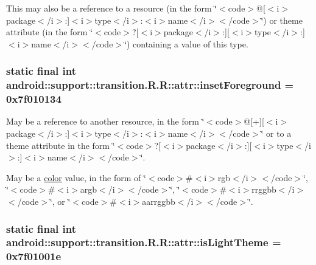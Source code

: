 This may also be a reference to a resource (in the form \char`\"{}$<$code$>$@\mbox{[}$<$i$>$package$<$/i$>$:\mbox{]}$<$i$>$type$<$/i$>$:$<$i$>$name$<$/i$>$$<$/code$>$\char`\"{}) or theme attribute (in the form \char`\"{}$<$code$>$?\mbox{[}$<$i$>$package$<$/i$>$:\mbox{]}\mbox{[}$<$i$>$type$<$/i$>$:\mbox{]}$<$i$>$name$<$/i$>$$<$/code$>$\char`\"{}) containing a value of this type. \hypertarget{classandroid_1_1support_1_1transition_1_1_r_1_1attr_d388c6c0c1f51b02f0308a0bafe4e93e}{
\subsubsection[{insetForeground}]{\setlength{\rightskip}{0pt plus 5cm}static final int android::support::transition.R.R::attr::insetForeground = 0x7f010134}}
\label{classandroid_1_1support_1_1transition_1_1_r_1_1attr_d388c6c0c1f51b02f0308a0bafe4e93e}


May be a reference to another resource, in the form \char`\"{}$<$code$>$@\mbox{[}+\mbox{]}\mbox{[}$<$i$>$package$<$/i$>$:\mbox{]}$<$i$>$type$<$/i$>$:$<$i$>$name$<$/i$>$$<$/code$>$\char`\"{} or to a theme attribute in the form \char`\"{}$<$code$>$?\mbox{[}$<$i$>$package$<$/i$>$:\mbox{]}\mbox{[}$<$i$>$type$<$/i$>$:\mbox{]}$<$i$>$name$<$/i$>$$<$/code$>$\char`\"{}. 

May be a \hyperlink{classandroid_1_1support_1_1transition_1_1_r_1_1color}{color} value, in the form of \char`\"{}$<$code$>$\#$<$i$>$rgb$<$/i$>$$<$/code$>$\char`\"{}, \char`\"{}$<$code$>$\#$<$i$>$argb$<$/i$>$$<$/code$>$\char`\"{}, \char`\"{}$<$code$>$\#$<$i$>$rrggbb$<$/i$>$$<$/code$>$\char`\"{}, or \char`\"{}$<$code$>$\#$<$i$>$aarrggbb$<$/i$>$$<$/code$>$\char`\"{}. \hypertarget{classandroid_1_1support_1_1transition_1_1_r_1_1attr_9d340fd5a35d4f7fbcd9a6c7e7fbbbaa}{
\subsubsection[{isLightTheme}]{\setlength{\rightskip}{0pt plus 5cm}static final int android::support::transition.R.R::attr::isLightTheme = 0x7f01001e}}
\label{classandroid_1_1support_1_1transition_1_1_r_1_1attr_9d340fd5a35d4f7fbcd9a6c7e7fbbbaa}


